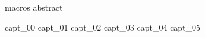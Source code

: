\documentclass[12pt,a4paper,oneside,english]{book}
\begin{document}




\runfrontend{}

{macros}
{abstract}

\sumario

\listadefiguras

\listadetabelas


	\listadesimbolos

	\listadeacronimos

	\listadenotacoes

\markboth{}{}

\mainmatter 
\setcounter{page}{1} \pagestyle{plain} 

{capt_00}
{capt_01}
{capt_02}
{capt_03}
{capt_04}
{capt_05}


%
% 
%


\end{document}
